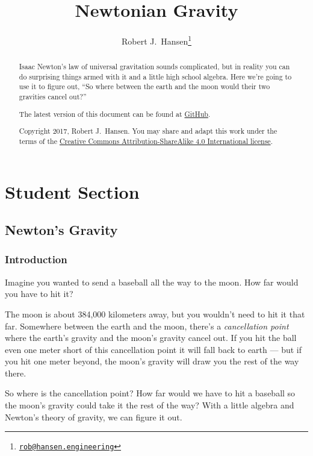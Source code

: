 \documentclass[10pt,letterpaper]{report}
\begin{document}
\title{Newtonian Gravity}
\author{Robert J.\ Hansen\thanks{\href{mailto:rob@hansen.engineering}{\nolinkurl{rob@hansen.engineering}}}}
\maketitle
\begin{abstract}

  Isaac Newton's law of universal gravitation sounds complicated, but in
  reality you can do surprising things armed with it and a little high
  school algebra.  Here we're going to use it to figure out, ``So
  where between the earth and the moon would their two gravities
  cancel out?''

  The latest version of this document can be found at
  \href{https://www.github.com/rjhansen/fun-math}{GitHub}.

  Copyright 2017, Robert J.\ Hansen.  You may share and adapt this
  work under the terms of the
  \href{https://creativecommons.org/licenses/by-sa/4.0/}{Creative
    Commons Attribution-ShareAlike 4.0 International license}.
  
\end{abstract}
\tableofcontents
\part{Student Section}
\chapter{Newton's Gravity}
\section{Introduction}
Imagine you wanted to send a baseball all the way to the moon.  How
far would you have to hit it?

The moon is about 384,000 kilometers away, but you wouldn't need to
hit it that far.  Somewhere between the earth and the moon, there's a
\textit{cancellation point} where the earth's gravity and the moon's
gravity cancel out.  If you hit the ball even one meter short of this
cancellation point it will fall back to earth --- but if you hit one
meter beyond, the moon's gravity will draw you the rest of the way
there.

So where is the cancellation point?  How far would we have to hit a
baseball so the moon's gravity could take it the rest of the way?
With a little algebra and Newton's theory of gravity, we can figure it
out.
\end{document}
